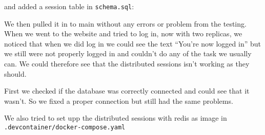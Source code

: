 and added a session table in \texttt{schema.sql}:

\begin{Shaded}
\begin{Highlighting}[]
\OperatorTok{(}
  \OperatorTok{,}
  \OperatorTok{,}
  \OperatorTok{,}
   \OperatorTok{,}
  \OperatorTok{,}
 \OperatorTok{(}\OperatorTok{)}
\OperatorTok{);}
\end{Highlighting}
\end{Shaded}

We then pulled it in to main without any errors or problem from the testing. When we went to the website and tried to log in, now with two replicas, we noticed that when we did log in we could see the text ``You're now logged in'' but we still were not properly logged in and couldn't do any of the task we usually can. We could therefore see that the distributed sessions isn't working as they should.

First we checked if the database was correctly connected and could see that it wasn't. So we fixed a proper connection but still had the same problems.

We also tried to set upp the distributed sessions with redis as image in \texttt{.devcontainer/docker-compose.yaml}

